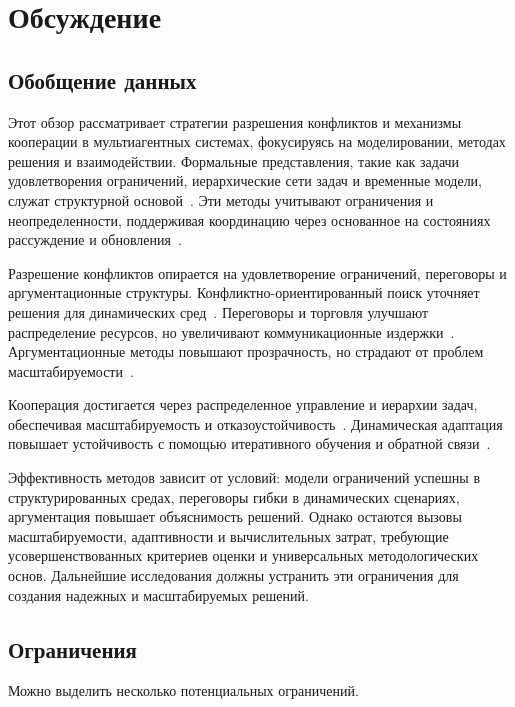 \section{Обсуждение}

\subsection{Обобщение данных}

Этот обзор рассматривает стратегии разрешения конфликтов и механизмы кооперации в мультиагентных системах,
фокусируясь на моделировании, методах решения и взаимодействии.
Формальные представления, такие как задачи удовлетворения ограничений,
иерархические сети задач и временные модели, служат структурной основой~\cite{GROSZ1996269,KOMENDA201476}.
Эти методы учитывают ограничения и неопределенности, поддерживая координацию через основанное на состояниях рассуждение и обновления~\cite{STOLBA2017175,LU2014215}.

Разрешение конфликтов опирается на удовлетворение ограничений, переговоры и аргументационные структуры.
Конфликтно-ориентированный поиск уточняет решения для динамических сред~\cite{SHARON201540}.
Переговоры и торговля улучшают распределение ресурсов,
но увеличивают коммуникационные издержки~\cite{PAJARESFERRANDO201322,FRANKOVIC20017}.
Аргументационные методы повышают прозрачность, но страдают от проблем масштабируемости~\cite{FERRANDO20171}.

Кооперация достигается через распределенное управление и иерархии задач,
обеспечивая масштабируемость и отказоустойчивость~\cite{MA2021103823,JUNG1999149}.
Динамическая адаптация повышает устойчивость с помощью итеративного обучения и обратной связи~\cite{SEMIZ2021220}.

Эффективность методов зависит от условий: модели ограничений успешны в структурированных средах,
переговоры гибки в динамических сценариях, аргументация повышает объяснимость решений.
Однако остаются вызовы масштабируемости, адаптивности и вычислительных затрат,
требующие усовершенствованных критериев оценки и универсальных методологических основ.
Дальнейшие исследования должны устранить эти ограничения для создания надежных и масштабируемых решений.

\subsection{Ограничения}

Можно выделить несколько потенциальных ограничений.  

